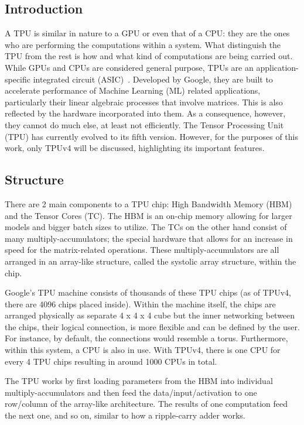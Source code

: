 \subsection{Introduction}
\label{subsec:introduction2}
A TPU is similar in nature to a GPU or even that of a CPU: they are the ones who are performing the computations within a system.
What distinguish the TPU from the rest is how and what kind of computations are being carried out.
While GPUs and CPUs are considered general purpose, TPUs are an application-specific integrated circuit (ASIC)~\cite{b6}.
Developed by Google, they are built to accelerate performance of Machine Learning (ML) related applications, particularly their linear algebraic processes that involve matrices.
This is also reflected by the hardware incorporated into them.
As a consequence, however, they cannot do much else, at least not efficiently.
The Tensor Processing Unit (TPU) has currently evolved to its fifth version.
However, for the purposes of this work, only TPUv4 will be discussed, highlighting its important features.

\subsection{Structure}
\label{subsec:structure}
There are 2 main components to a TPU chip: High Bandwidth Memory (HBM) and the Tensor Cores (TC).
The HBM is an on-chip memory allowing for larger models and bigger batch sizes to utilize.
The TCs on the other hand consist of many multiply-accumulators; the special hardware that allows for an increase in speed for the matrix-related operations.
These multiply-accumulators are all arranged in an array-like structure, called the systolic array structure, within the chip.

Google’s TPU machine consists of thousands of these TPU chips (as of TPUv4, there are 4096 chips placed inside).
Within the machine itself, the chips are arranged physically as separate 4 x 4 x 4 cube but the inner networking between the chips, their logical connection, is more flexible and can be defined by the user.
For instance, by default, the connections would resemble a torus.
Furthermore, within this system, a CPU is also in use.
With TPUv4, there is one CPU for every 4 TPU chips resulting in around 1000 CPUs in total.

The TPU works by first loading parameters from the HBM into individual multiply-accumulators and then feed the data/input/activation to one row/column of the array-like architecture.
The results of one computation feed the next one, and so on, similar to how a ripple-carry adder works.

